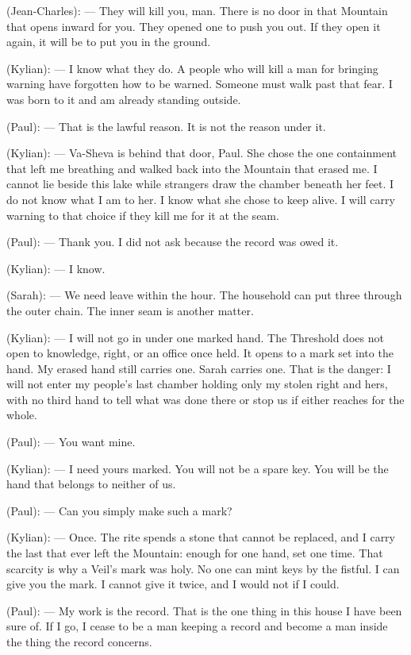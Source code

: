 \begin{room}
(Jean-Charles): --- They will kill you, man. There is no door in that Mountain that opens inward for you. They opened one to push you out. If they open it again, it will be to put you in the ground.

(Kylian): --- I know what they do. A people who will kill a man for bringing warning have forgotten how to be warned. Someone must walk past that fear. I was born to it and am already standing outside.

(Paul): --- That is the lawful reason. It is not the reason under it.

\centerline{}

(Kylian): --- Va-Sheva is behind that door, Paul. She chose the one containment that left me breathing and walked back into the Mountain that erased me. I cannot lie beside this lake while strangers draw the chamber beneath her feet. I do not know what I am to her. I know what she chose to keep alive. I will carry warning to that choice if they kill me for it at the seam.

(Paul): --- Thank you. I did not ask because the record was owed it.

(Kylian): --- I know.

(Sarah): --- We need leave within the hour. The household can put three through the outer chain. The inner seam is another matter.

(Kylian): --- I will not go in under one marked hand. The Threshold does not open to knowledge, right, or an office once held. It opens to a mark set into the hand. My erased hand still carries one. Sarah carries one. That is the danger: I will not enter my people's last chamber holding only my stolen right and hers, with no third hand to tell what was done there or stop us if either reaches for the whole.

(Paul): --- You want mine.

(Kylian): --- I need yours marked. You will not be a spare key. You will be the hand that belongs to neither of us.

(Paul): --- Can you simply make such a mark?

(Kylian): --- Once. The rite spends a stone that cannot be replaced, and I carry the last that ever left the Mountain: enough for one hand, set one time. That scarcity is why a Veil's mark was holy. No one can mint keys by the fistful. I can give you the mark. I cannot give it twice, and I would not if I could.

(Paul): --- My work is the record. That is the one thing in this house I have been sure of. If I go, I cease to be a man keeping a record and become a man inside the thing the record concerns.


\end{room}
